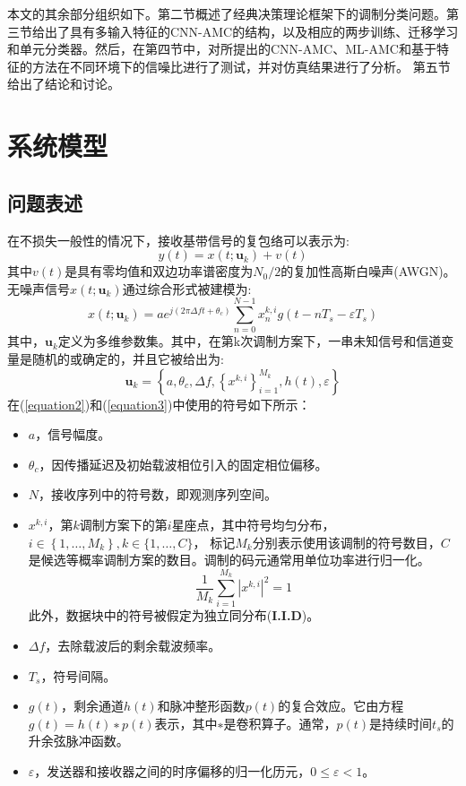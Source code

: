 \documentclass[final]{cvpr}
\begin{document}
本文的其余部分组织如下。第二节概述了经典决策理论框架下的调制分类问题。第三节给出了具有多输入特征的CNN-AMC的结构，以及相应的两步训练、迁移学习和单元分类器。然后，在第四节中，对所提出的CNN-AMC、ML-AMC和基于特征的方法在不同环境下的信噪比进行了测试，并对仿真结果进行了分析。
第五节给出了结论和讨论。
\section{系统模型}
\label{sec:SystemModel}
\subsection{问题表述}
\label{sec:Problemfor}
在不损失一般性的情况下，接收基带信号的复包络可以表示为:
\begin{equation}
y(t)=x\left(t ; \mathbf{u}_{k}\right)+v(t)\label{equation1}
\end{equation}
其中$v(t)$是具有零均值和双边功率谱密度为$N_0/2$的复加性高斯白噪声(AWGN)。无噪声信号$x\left(t ; \mathbf{u}_{k}\right)$通过综合形式被建模为:
\begin{equation}
x\left(t ; \mathbf{u}_{k}\right)=a e^{j\left(2 \pi \Delta f t+\theta_{c}\right)} \sum_{n=0}^{N-1} x_{n}^{k, i} g\left(t-n T_{s}-\varepsilon T_{s}\right)\label{equation2}
\end{equation}
其中，$\mathbf{u}_{k}$定义为多维参数集。其中，在第k次调制方案下，一串未知信号和信道变量是随机的或确定的，并且它被给出为:
\begin{equation}
\mathbf{u}_{k}=\left\{a, \theta_{c}, \Delta f,\left\{x^{k, i}\right\}_{i=1}^{M_{k}}, h(t), \varepsilon\right\}\label{equation3}
\end{equation}
在(\ref{equation2})和(\ref{equation3})中使用的符号如下所示：
\begin{itemize}
\item $a$，信号幅度。
\item $\theta_{c}$，因传播延迟及初始载波相位引入的固定相位偏移。
\item $N$，接收序列中的符号数，即观测序列空间。
\item $x^{k, i}$，第$k$调制方案下的第$i$星座点，其中符号均匀分布，
$i \in\left\{1, \ldots, M_{k}\right\}, k \in\{1, \ldots, C\}$，
标记$M_k$分别表示使用该调制的符号数目，$C$是候选等概率调制方案的数目。调制的码元通常用单位功率进行归一化。
\begin{equation}
\frac{1}{M_{k}} \sum_{i=1}^{M_{k}}\left|x^{k, i}\right|^{2}=1\label{equation4}
\end{equation}
此外，数据块中的符号被假定为独立同分布(\textbf{I.I.D})。
\item $\Delta f$，去除载波后的剩余载波频率。
\item $T_s$，符号间隔。
\item $g(t)$，剩余通道$h(t)$和脉冲整形函数$p(t)$的复合效应。它由方程$g(t)=h(t)∗p(t)$表示，其中$∗$是卷积算子。通常，$p(t)$是持续时间$t_s$的升余弦脉冲函数。
\item $\varepsilon$，发送器和接收器之间的时序偏移的归一化历元，$0\leq \varepsilon <1$。
\end{itemize}
\end{document}
